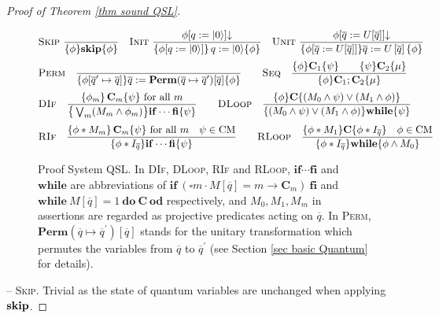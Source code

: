 \documentclass[conference,compsoc, 10pt]{IEEEtran}
\newcommand {\qbar} {{\overline{q}}}
\newcommand {\qI} {{q:=|0\rangle}}
\newcommand {\qU} {{\overline{q}:=U[\overline{q}]}}
\newcommand {\id } {{I}}
\newcommand{\Mexist}{{\downarrow}}
\newcommand {\prog } {{\mathbf{C}}}
\newcommand {\perm} {\mathbf{Perm}}
\begin{document}
\begin{appendices}
\begin{proof}[Proof of Theorem \ref{thm sound QSL}]
			\begin{figure}[h]\centering
				\begin{equation*}\begin{split}
				&\textsc{Skip}\ \frac{}{\{\phi\}\mathbf{skip}\{\phi\}}\quad 
				\textsc{Init}\ \frac{\phi[\qI]\Mexist}{\left\{\phi[\qI] \right\}\qI\{\phi\}}\quad
				\textsc{Unit}\ \frac{\phi[\qU]\Mexist}{
					\{\phi[\qU]\}\qbar:=U\left[\qbar\right]\{\phi\}}\\[0.1cm]
				&\textsc{Perm}\quad \frac{}{\{\phi[\qbar^\prime\mapsto\qbar]\}\qbar:=\perm(\qbar\mapsto\qbar^\prime)[\qbar]\{\phi\}} \qquad
				\textsc{Seq}\quad
				\frac{\{\phi\}\prog_1\{\psi\}\ \ \ \ \ \ \{\psi\}\prog_2\{\mu\}}{\{\phi\}\prog_1;\prog_2\{\mu\}}\\[0.1cm]
				&\textsc{DIf}\quad
				\frac{\left\{\phi_m\right\}\prog_m\{\psi\}\ {\rm for\ all}\ m}{\big\{\bigvee_m(M_m\wedge \phi_m)\big\}\mathbf{if}\cdots\mathbf{fi}\{\psi\}}\qquad
				\textsc{DLoop}\quad
				\frac{\{\phi\}\prog\{(M_0\wedge \psi)\vee (M_1\wedge \phi)\}}{\{(M_0\wedge \psi)\vee (M_1\wedge \phi)\}\mathbf{while}\{\psi\}} \\[0.1cm]
				&\textsc{RIf}\quad\frac{\left\{\phi\ast M_m\right\}\prog_m\{\psi\}\ {\rm for\ all}\ m\quad \psi\in \text{CM}}{\{\phi\ast\id_{\qbar}\}\mathbf{if}\cdots\mathbf{fi}\{\psi\}}\qquad
				\textsc{RLoop}\quad\frac{\{\phi\ast M_1\}\prog\{\phi\ast\id_{\qbar}\}\quad\phi\in\text{CM}}{\{\phi\ast\id_{\qbar}\}\mathbf{while}\{\phi\wedge M_0\}} 
				\end{split}\end{equation*}
				\caption{Proof System QSL. In \textsc{DIf}, \textsc{DLoop}, \textsc{RIf} and \textsc{RLoop}, $\mathbf{if}\cdots\mathbf{fi}$ and $\mathbf{while}$ are abbreviations of $\mathbf{if}\ (\square m\cdot M[\qbar] = m \rightarrow \prog_m )\ \mathbf{fi}$ and $\mathbf{while}\ M[\qbar]=1\ \mathbf{do}\ \prog\ \mathbf{od}$ respectively, and  $M_0,M_1,M_m$ in assertions are regarded as projective predicates acting on $\qbar$. In \textsc{Perm}, $\perm(\qbar\mapsto\qbar^\prime)[\qbar]$ stands for the unitary transformation which permutes the variables from $\qbar$ to $\qbar^\prime$ (see Section \ref{sec basic Quantum} for details).
				}
			\end{figure}
			
			\noindent -- \textsc{Skip}. Trivial as the state of quantum variables are unchanged when applying ${\bf skip}$.
			

\end{proof}
\end{appendices}
\end{document}
